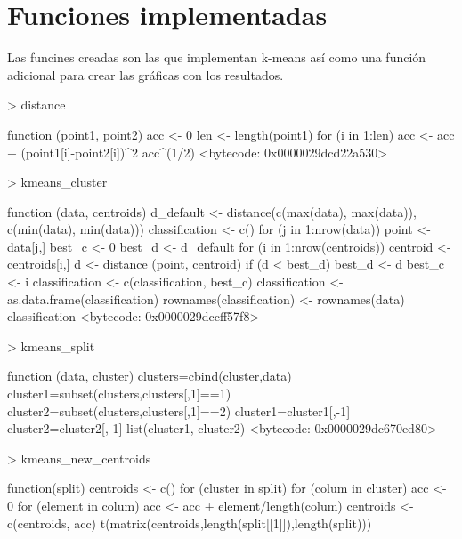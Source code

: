 \documentclass [a4paper] {article}
\begin{document}
\newpage
\section{Funciones implementadas}
Las funcines creadas son las que implementan k-means así como una función adicional para crear las gráficas con los resultados.
\begin{Schunk}
\begin{Sinput}
> distance
\end{Sinput}
\begin{Soutput}
function (point1, point2) {
  acc <- 0
  len <- length(point1)
  for (i in 1:len){
    acc <- acc + (point1[i]-point2[i])^2
  }
  acc^(1/2)
}
<bytecode: 0x0000029dcd22a530>
\end{Soutput}
\begin{Sinput}
> kmeans_cluster
\end{Sinput}
\begin{Soutput}
function (data, centroids) {
  d_default <- distance(c(max(data), max(data)), c(min(data), min(data)))
  classification <- c()
  for (j in 1:nrow(data)){
      point <- data[j,]
      best_c <- 0
      best_d <- d_default
      for (i in 1:nrow(centroids)){
        centroid <- centroids[i,]
        d <- distance (point, centroid)
        if (d < best_d){
          best_d <- d
          best_c <- i
        }
    }
    classification <- c(classification, best_c)
  }
  classification <- as.data.frame(classification)
  rownames(classification) <- rownames(data)
  classification
}
<bytecode: 0x0000029dccff57f8>
\end{Soutput}
\begin{Sinput}
> kmeans_split
\end{Sinput}
\begin{Soutput}
function (data, cluster) {
  clusters=cbind(cluster,data)
  cluster1=subset(clusters,clusters[,1]==1)
  cluster2=subset(clusters,clusters[,1]==2)
  cluster1=cluster1[,-1]
  cluster2=cluster2[,-1]
  list(cluster1, cluster2)
}
<bytecode: 0x0000029dc670ed80>
\end{Soutput}
\begin{Sinput}
> kmeans_new_centroids
\end{Sinput}
\begin{Soutput}
function(split){
  centroids <- c()
  for (cluster in split) {
    for (colum in cluster) {
      acc <- 0
      for (element in colum){
        acc <- acc + element/length(colum)
      }
      centroids <- c(centroids, acc)
    }
  }
  t(matrix(centroids,length(split[[1]]),length(split)))
}
\end{Soutput}
\end{Schunk}
\end{document}
